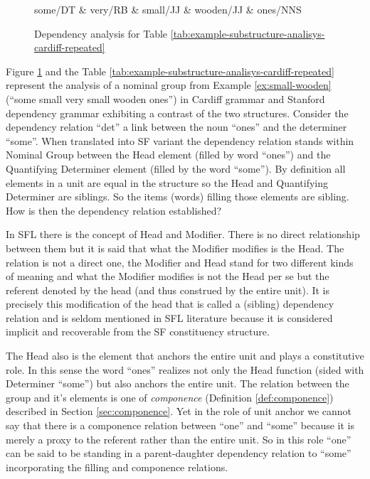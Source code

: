 \begin{figure}[ht]
	\centering
	\begin{dependency}
		\begin{deptext}[]
			some/DT \& very/RB \& small/JJ \& wooden/JJ \& ones/NNS \\
		\end{deptext}
	\end{dependency}
	\caption{Dependency analysis for Table \ref{tab:example-substructure-analisys-cardiff-repeated} }
	\label{fig:small-wooden-dependecy}
\end{figure}



Figure \ref{fig:small-wooden-dependecy} and the Table \ref{tab:example-substructure-analisys-cardiff-repeated} represent the analysis of a nominal group from Example \ref{ex:small-wooden} (``some small very small wooden ones'') in Cardiff grammar and Stanford dependency grammar exhibiting a contrast of the two structures. Consider the dependency relation ``det'' a link between the noun ``ones'' and the determiner ``some''. When translated into SF variant the dependency relation stands within Nominal Group between the Head element (filled by word ``ones'') and the Quantifying Determiner element (filled by the word ``some''). By definition all elements in a unit are equal in the structure so the Head and Quantifying Determiner are siblings. So the items (words) filling those elements are sibling. How is then the dependency relation established? 

In SFL there is the concept of Head and Modifier. There is no direct relationship between them but it is said that what the Modifier modifies is the Head. The relation is not a direct one, the Modifier and Head stand for two different kinds of meaning and what the Modifier modifies is not the Head per se but the referent denoted by the head (and thus construed by the entire unit). It is precisely this modification of the head that is called a (sibling) dependency relation and is seldom mentioned in SFL literature because it is considered implicit and recoverable from the SF constituency structure.

The Head also is the element that anchors the entire unit and plays a constitutive role. In this sense the word ``ones'' realizes not only the Head function (sided with Determiner ``some'') but also anchors the entire unit. The relation between the group and it's elements is one of \textit{componence} (Definition \ref{def:componence}) described in Section \ref{sec:componence}. Yet in the role of unit anchor we cannot say that there is a componence relation between ``one'' and ``some'' because it is merely a proxy to the referent rather than the entire unit. So in this role ``one'' can be said to be standing in a parent-daughter dependency relation to ``some'' incorporating the filling and componence relations.

